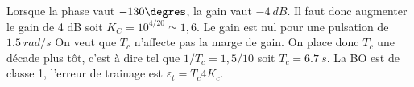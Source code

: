 \begin{corrigebox}
\begin{center}
\end{center}\par\medskip
{}
Lorsque la phase vaut $-130\degres$, la gain vaut $-\SI{4}{dB}$. Il faut donc augmenter le gain de 4 dB soit $K_C = 10^{4/20} \simeq 1,6$.
Le gain est nul pour une pulsation de $\SI{1,5}{rad/s}$ On veut que $T_c$ n'affecte pas la marge de gain. On place donc $T_c$ une décade plus tôt, c'est à dire tel que $1/T_c = 1,5/10$ soit $T_c = \SI{6,7}{s}.$
La BO est de classe 1, l'erreur de trainage est $\varepsilon_t = {T_c}{4K_c}$.
\end{corrigebox}
